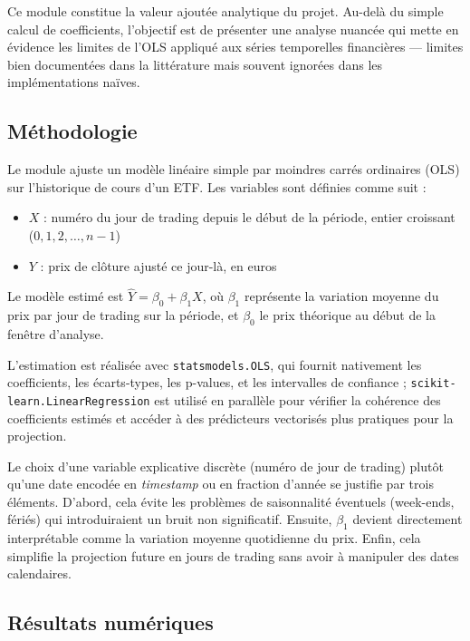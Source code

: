 \documentclass[11pt,a4paper]{article}
\begin{document}
Ce module constitue la valeur ajoutée analytique du projet. Au-delà du
simple calcul de coefficients, l'objectif est de présenter une analyse
nuancée qui mette en évidence les limites de l'OLS appliqué aux séries
temporelles financières — limites bien documentées dans la littérature
mais souvent ignorées dans les implémentations naïves.

\subsection{Méthodologie}

Le module ajuste un modèle linéaire simple par moindres carrés
ordinaires (OLS) sur l'historique de cours d'un ETF. Les variables
sont définies comme suit :

\begin{itemize}
    \item $X$ : numéro du jour de trading depuis le début de la
    période, entier croissant ($0, 1, 2, \dots, n-1$)
    \item $Y$ : prix de clôture ajusté ce jour-là, en euros
\end{itemize}

Le modèle estimé est $\hat{Y} = \beta_0 + \beta_1 X$, où $\beta_1$
représente la variation moyenne du prix par jour de trading sur la
période, et $\beta_0$ le prix théorique au début de la fenêtre
d'analyse.

L'estimation est réalisée avec \texttt{statsmodels.OLS}, qui fournit
nativement les coefficients, les écarts-types, les p-values, et les
intervalles de confiance ; \texttt{scikit-learn.LinearRegression} est
utilisé en parallèle pour vérifier la cohérence des coefficients
estimés et accéder à des prédicteurs vectorisés plus pratiques pour la
projection.

Le choix d'une variable explicative discrète (numéro de jour de
trading) plutôt qu'une date encodée en \textit{timestamp} ou en
fraction d'année se justifie par trois éléments. D'abord, cela évite
les problèmes de saisonnalité éventuels (week-ends, fériés) qui
introduiraient un bruit non significatif. Ensuite, $\beta_1$ devient
directement interprétable comme la variation moyenne quotidienne du
prix. Enfin, cela simplifie la projection future en jours de trading
sans avoir à manipuler des dates calendaires.

\subsection{Résultats numériques}
\label{subsec:reg-results}
\end{document}
